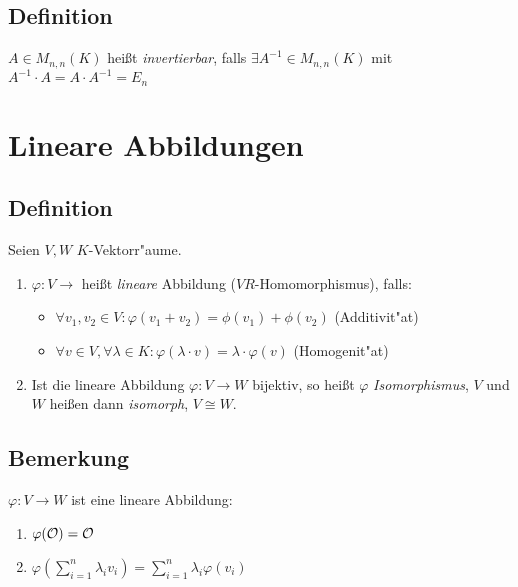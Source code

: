 	 \subsection{Definition}
	 
	 $A \in M_{n,n}(K)$ heißt \emph{invertierbar}, falls $\exists  A^{-1} \in M_{n,n}(K)$ mit $A^{-1} \cdot A = A \cdot A^{-1} = E_n$
	 

\section{Lineare Abbildungen}

\subsection{Definition}

Seien $V,W$ $K$-Vektorr"aume.
\begin{enumerate}
	\item
	$\varphi: V \rightarrow$ heißt \emph{lineare} Abbildung ($VR$-Homomorphismus), falls:
	\begin{itemize}
		\item
		$\forall v_1, v_2 \in V: \varphi(v_1+v_2) = \phi(v_1) + \phi(v_2)$ (Additivit"at)
		\item
		$\forall v \in V, \forall \lambda \in K: \varphi(\lambda \cdot v) = \lambda \cdot \varphi(v)$ (Homogenit"at)
	\end{itemize}
	\item
	Ist die lineare Abbildung $\varphi: V \rightarrow W$ bijektiv, so heißt $\varphi$ \emph{Isomorphismus}, $V$ und $W$ heißen dann \emph{isomorph}, $V \cong W$.
\end{enumerate}

\subsection{Bemerkung}
$\varphi: V \rightarrow W$ ist eine lineare Abbildung:
\begin{enumerate}
	\item
	$\varphi( \mathcal{O}) = \mathcal{O}$
	\item
	$\varphi \left(\sum_{i=1}^{n} \lambda_i v_i \right) = \sum_{i=1}^{n} \lambda_i \varphi(v_i)$ 
\end{enumerate}

